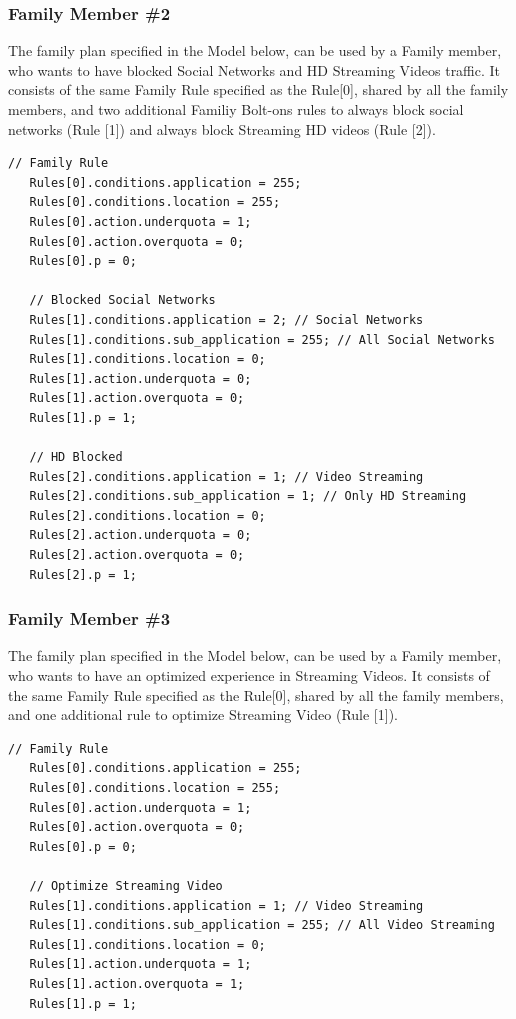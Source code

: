 \subsubsection{Family Member \#2}
\noindent
The family plan specified in the Model below, can be used by a Family member, who wants to have blocked Social Networks and HD Streaming Videos traffic. It consists of the same Family Rule specified as the Rule[0], shared by all the family members, and two additional Familiy Bolt-ons rules to always block social networks (Rule [1]) and always block Streaming HD videos (Rule [2]). \\

\singlespacing
\begin{lstlisting}[caption=Family Member\#2 Model,
  label=FamilyP2_Listing]
   // Family Rule
   Rules[0].conditions.application = 255;
   Rules[0].conditions.location = 255;
   Rules[0].action.underquota = 1;
   Rules[0].action.overquota = 0;
   Rules[0].p = 0;

   // Blocked Social Networks
   Rules[1].conditions.application = 2; // Social Networks
   Rules[1].conditions.sub_application = 255; // All Social Networks
   Rules[1].conditions.location = 0;
   Rules[1].action.underquota = 0;
   Rules[1].action.overquota = 0;
   Rules[1].p = 1;

   // HD Blocked
   Rules[2].conditions.application = 1; // Video Streaming
   Rules[2].conditions.sub_application = 1; // Only HD Streaming
   Rules[2].conditions.location = 0;
   Rules[2].action.underquota = 0;
   Rules[2].action.overquota = 0;
   Rules[2].p = 1;
\end{lstlisting}
\doublespacing

\subsubsection{Family Member \#3}
\noindent
The family plan specified in the Model below, can be used by a Family member, who wants to have an optimized experience in Streaming Videos. It consists of the same Family Rule specified as the Rule[0], shared by all the family members, and one additional rule to optimize Streaming Video (Rule [1]). \\

\singlespacing
\begin{lstlisting}[caption=Family Member\#3 Model,
  label=FamilyP2_Listing]
   // Family Rule
   Rules[0].conditions.application = 255;
   Rules[0].conditions.location = 255;
   Rules[0].action.underquota = 1;
   Rules[0].action.overquota = 0;
   Rules[0].p = 0;

   // Optimize Streaming Video
   Rules[1].conditions.application = 1; // Video Streaming
   Rules[1].conditions.sub_application = 255; // All Video Streaming
   Rules[1].conditions.location = 0;
   Rules[1].action.underquota = 1;
   Rules[1].action.overquota = 1;
   Rules[1].p = 1;
\end{lstlisting}
\doublespacing


